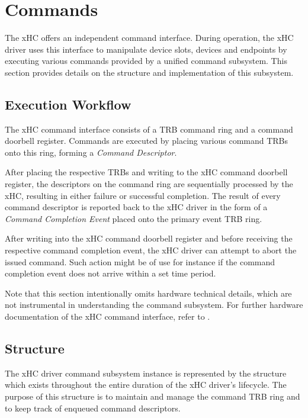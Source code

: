 \section{Commands}
\label{sec:commands}

The xHC offers an independent command interface. During operation, the xHC
driver uses this interface to manipulate device slots, devices and endpoints by
executing various commands provided by a unified command subsystem. This
section provides details on the structure and implementation of this subsystem.


\subsection{Execution Workflow}

The xHC command interface consists of a TRB command ring and a command doorbell
register. Commands are executed by placing various command TRBs onto this ring,
forming a \textit{Command Descriptor}.

After placing the respective TRBs and writing to the xHC command doorbell
register, the descriptors on the command ring are sequentially processed by the
xHC, resulting in either failure or successful completion. The result of every
command descriptor is reported back to the xHC driver in the form of a
\textit{Command Completion Event} placed onto the primary event TRB ring.

After writing into the xHC command doorbell register and before receiving the
respective command completion event, the xHC driver can attempt to abort the
issued command. Such action might be of use for instance if the command
completion event does not arrive within a set time period.

Note that this section intentionally omits hardware technical details, which are
not instrumental in understanding the command subsystem. For further hardware
documentation of the xHC command interface, refer to .


\subsection{Structure}

The xHC driver command subsystem instance is represented by the
 structure which exists throughout the entire duration
of the xHC driver's lifecycle. The purpose of this structure is to maintain and
manage the command TRB ring and to keep track of enqueued command descriptors.

